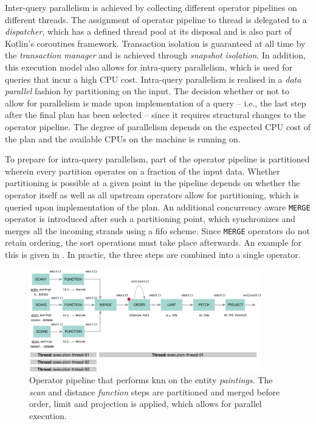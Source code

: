 Inter-query parallelism is achieved by collecting different operator pipelines on different threads. The assignment of operator pipeline to thread is delegated to a \emph{dispatcher}, which has a defined thread pool at its disposal and is also part of Kotlin's coroutines framework. Transaction isolation is guaranteed at all time by the \emph{transaction manager} and is achieved through \emph{snapshot isolation}. In addition, this execution model also allows for intra-query parallelism, which is used for queries that incur a high CPU cost. Intra-query parallelism is realised in a \emph{data parallel} fashion by partitioning on the input. The decision whether or not to allow for parallelism is made upon implementation of a query -- i.e., the last step after the final plan has been selected -- since it requires structural changes to the operator pipeline. The degree of parallelism depends on the expected CPU cost of the plan and the available CPUs on the machine \cottontail{} is running on.

To prepare for intra-query parallelism, part of the operator pipeline is partitioned wherein every partition operates on a fraction of the input data. Whether partitioning is possible at a given point in the pipeline depends on whether the operator itself as well as all upstream operators allow for partitioning, which is queried upon implementation of the plan. An additional concurrency aware \texttt{MERGE} operator is introduced after such a partitioning point, which synchronizes and merges all the incoming strands using a \acrshort{fifo} scheme. Since \texttt{MERGE} operators do not retain ordering, the sort operations must take place afterwards. An example for this is given in . In practic, the three steps are combined into a single operator.

\begin{figure}[bt]
    \centering
    \includegraphics[width=0.9\textwidth]{figures/execution-model-parallel}
    \caption{Operator pipeline that performs \acrshort{knn} on the entity \emph{paintings}. The \emph{scan} and distance \emph{function} steps are partitioned and merged before order, limit and projection is applied, which allows for parallel execution.}
    \label{figure:cottontail_execution_model_parallel}
\end{figure}


